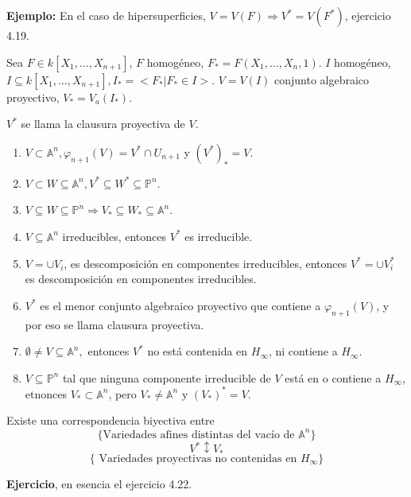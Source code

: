 \textbf{Ejemplo: } En el caso de hipersuperficies, $V=V(F) \Rightarrow V^*=V(F^*)$, ejercicio 4.19. 

\begin{Def}
Sea $F\in k[X_1,\dots , X_{n+1}]$, $F$ homogéneo, $F_*=F(X_1,\dots , X_n,1)$. $I$ homogéneo, $I\subseteq k[X_1,\dots , X_{n+1}], I_*=<F_* | F_* \in I >$. $V=V(I)$ conjunto algebraico proyectivo, $V_*=V_a(I_*)$. 
\end{Def}
\begin{Def}
$V^*$ se llama la clausura proyectiva de $V$. 
\end{Def}


\begin{Lem}
\begin{enumerate}
\item $V\subset \mathbb{A}^n, \varphi_{n+1}(V)=V^* \cap U_{n+1}$ y $(V^*)_*=V$.
\item $V\subset W \subseteq \mathbb{A}^n, V^*\subseteq W^* \subseteq \mathbb{P}^n$.
\item $V\subseteq W \subseteq \mathbb{P}^n \Rightarrow V_*\subseteq W_* \subseteq \mathbb{A}^n$. 
\item $V\subseteq \mathbb{A}^n$ irreducibles, entonces $V^*$ es irreducible. 
\item $V=\cup V_i$, es descomposición en componentes irreducibles, entonces $V^*=\cup V_i^*$ es descomposición en componentes irreducibles.
\item $V^*$ es el menor conjunto algebraico proyectivo que contiene a $\varphi_{n+1}(V)$, y por eso se llama clausura proyectiva. 
\item $\emptyset \neq V\subseteq \mathbb{A}^n,$ entonces $V^*$ no está contenida en $H_\infty$, ni contiene a $H_\infty$. 
\item $V\subseteq \mathbb{P}^n$ tal que ninguna componente irreducible de $V$ está en o contiene a $H_\infty$, etnonces $V_*\subset \mathbb{A}^n$, pero $V_*\not = \mathbb{A}^n$ y $(V_*)^*=V$. 
\end{enumerate}
\end{Lem}

\begin{Prop}
Existe una correspondencia biyectiva entre 
$$ \{ \text{Variedades afines distintas del vacío de } \mathbb{A}^n\}$$
$$V^* \updownarrow V_* $$
$$ \{ \text{ Variedades proyectivas no contenidas en } H_\infty\}$$
\end{Prop}

\begin{Dem}
\textbf{Ejercicio}, en esencia el ejercicio 4.22.
\end{Dem}

